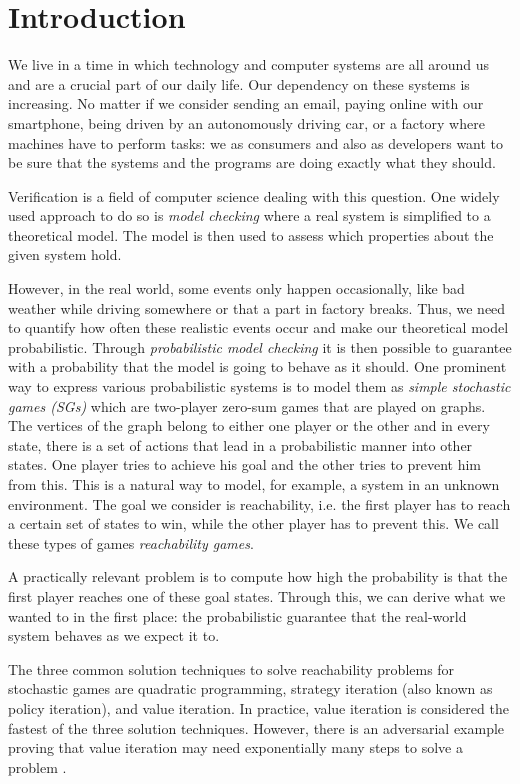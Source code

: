 \chapter{Introduction} \label{ch:intro}

We live in a time in which technology and computer systems are all around us and are a crucial part of our daily life. 
Our dependency on these systems is increasing. 
No matter if we consider sending an email, paying online with our smartphone, being driven by an autonomously driving car, or a factory where machines have to perform tasks: 
we as consumers and also as developers want to be sure that the systems and the programs are doing exactly what they should.

Verification is a field of computer science dealing with this question. 
One widely used approach to do so is \emph{model checking} where a real system is simplified to a theoretical model.
The model is then used to assess which properties about the given system hold.

However, in the real world, some events only happen occasionally, like bad weather while driving somewhere or that a part in factory breaks. 
Thus, we need to quantify how often these realistic events occur and make our theoretical model probabilistic. 
Through \emph{probabilistic model checking} it is then possible to guarantee with a probability that the model is going to behave as it should. 
One prominent way to express various probabilistic systems is to model them as \emph{simple stochastic games (SGs)} which are two-player zero-sum games that are played on graphs. 
The vertices of the graph belong to either one player or the other and in every state, there is a set of actions that lead in a probabilistic manner into other states. 
One player tries to achieve his goal and the other tries to prevent him from this. This is a natural way to model, for example, a system in an unknown environment.
The goal we consider is reachability, i.e. the first player has to reach a certain set of states to win, while the other player has to prevent this. 
We call these types of games \emph{reachability games}.

A practically relevant problem is to compute how high the probability is that the first player reaches one of these goal states. 
Through this, we can derive what we wanted to in the first place: 
the probabilistic guarantee that the real-world system behaves as we expect it to.

The three common solution techniques to solve reachability problems for stochastic games are quadratic programming, 
strategy iteration (also known as policy iteration), and value iteration.
In practice, value iteration is considered the fastest of the three solution techniques.
However, there is an adversarial example proving that value iteration may need exponentially many steps to solve a problem \cite{viExponential}.


